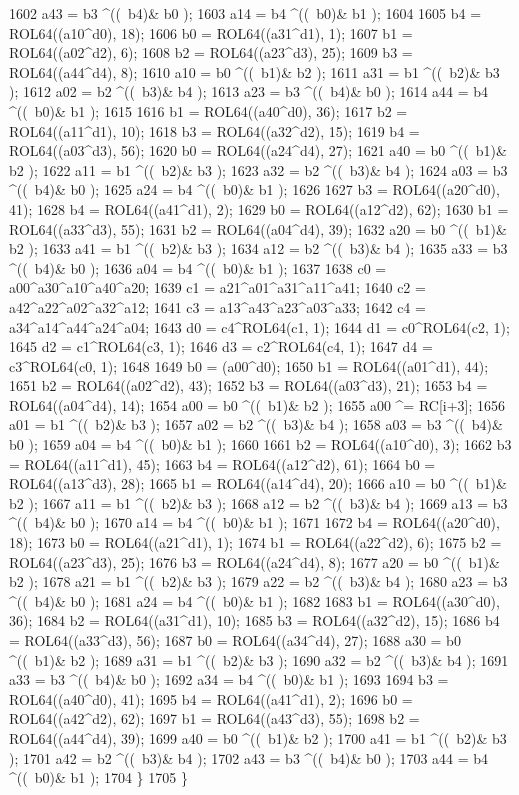 \begin{DoxyCode}
1602     a43 =   b3 ^((~b4)&  b0 );
1603     a14 =   b4 ^((~b0)&  b1 );
1604 
1605     b4 = ROL64((a10^d0), 18);
1606     b0 = ROL64((a31^d1), 1);
1607     b1 = ROL64((a02^d2), 6);
1608     b2 = ROL64((a23^d3), 25);
1609     b3 = ROL64((a44^d4), 8);
1610     a10 =   b0 ^((~b1)&  b2 );
1611     a31 =   b1 ^((~b2)&  b3 );
1612     a02 =   b2 ^((~b3)&  b4 );
1613     a23 =   b3 ^((~b4)&  b0 );
1614     a44 =   b4 ^((~b0)&  b1 );
1615 
1616     b1 = ROL64((a40^d0), 36);
1617     b2 = ROL64((a11^d1), 10);
1618     b3 = ROL64((a32^d2), 15);
1619     b4 = ROL64((a03^d3), 56);
1620     b0 = ROL64((a24^d4), 27);
1621     a40 =   b0 ^((~b1)&  b2 );
1622     a11 =   b1 ^((~b2)&  b3 );
1623     a32 =   b2 ^((~b3)&  b4 );
1624     a03 =   b3 ^((~b4)&  b0 );
1625     a24 =   b4 ^((~b0)&  b1 );
1626 
1627     b3 = ROL64((a20^d0), 41);
1628     b4 = ROL64((a41^d1), 2);
1629     b0 = ROL64((a12^d2), 62);
1630     b1 = ROL64((a33^d3), 55);
1631     b2 = ROL64((a04^d4), 39);
1632     a20 =   b0 ^((~b1)&  b2 );
1633     a41 =   b1 ^((~b2)&  b3 );
1634     a12 =   b2 ^((~b3)&  b4 );
1635     a33 =   b3 ^((~b4)&  b0 );
1636     a04 =   b4 ^((~b0)&  b1 );
1637 
1638     c0 = a00^a30^a10^a40^a20;
1639     c1 = a21^a01^a31^a11^a41;
1640     c2 = a42^a22^a02^a32^a12;
1641     c3 = a13^a43^a23^a03^a33;
1642     c4 = a34^a14^a44^a24^a04;
1643     d0 = c4^ROL64(c1, 1);
1644     d1 = c0^ROL64(c2, 1);
1645     d2 = c1^ROL64(c3, 1);
1646     d3 = c2^ROL64(c4, 1);
1647     d4 = c3^ROL64(c0, 1);
1648 
1649     b0 = (a00^d0);
1650     b1 = ROL64((a01^d1), 44);
1651     b2 = ROL64((a02^d2), 43);
1652     b3 = ROL64((a03^d3), 21);
1653     b4 = ROL64((a04^d4), 14);
1654     a00 =   b0 ^((~b1)&  b2 );
1655     a00 ^= RC[i+3];
1656     a01 =   b1 ^((~b2)&  b3 );
1657     a02 =   b2 ^((~b3)&  b4 );
1658     a03 =   b3 ^((~b4)&  b0 );
1659     a04 =   b4 ^((~b0)&  b1 );
1660 
1661     b2 = ROL64((a10^d0), 3);
1662     b3 = ROL64((a11^d1), 45);
1663     b4 = ROL64((a12^d2), 61);
1664     b0 = ROL64((a13^d3), 28);
1665     b1 = ROL64((a14^d4), 20);
1666     a10 =   b0 ^((~b1)&  b2 );
1667     a11 =   b1 ^((~b2)&  b3 );
1668     a12 =   b2 ^((~b3)&  b4 );
1669     a13 =   b3 ^((~b4)&  b0 );
1670     a14 =   b4 ^((~b0)&  b1 );
1671 
1672     b4 = ROL64((a20^d0), 18);
1673     b0 = ROL64((a21^d1), 1);
1674     b1 = ROL64((a22^d2), 6);
1675     b2 = ROL64((a23^d3), 25);
1676     b3 = ROL64((a24^d4), 8);
1677     a20 =   b0 ^((~b1)&  b2 );
1678     a21 =   b1 ^((~b2)&  b3 );
1679     a22 =   b2 ^((~b3)&  b4 );
1680     a23 =   b3 ^((~b4)&  b0 );
1681     a24 =   b4 ^((~b0)&  b1 );
1682 
1683     b1 = ROL64((a30^d0), 36);
1684     b2 = ROL64((a31^d1), 10);
1685     b3 = ROL64((a32^d2), 15);
1686     b4 = ROL64((a33^d3), 56);
1687     b0 = ROL64((a34^d4), 27);
1688     a30 =   b0 ^((~b1)&  b2 );
1689     a31 =   b1 ^((~b2)&  b3 );
1690     a32 =   b2 ^((~b3)&  b4 );
1691     a33 =   b3 ^((~b4)&  b0 );
1692     a34 =   b4 ^((~b0)&  b1 );
1693 
1694     b3 = ROL64((a40^d0), 41);
1695     b4 = ROL64((a41^d1), 2);
1696     b0 = ROL64((a42^d2), 62);
1697     b1 = ROL64((a43^d3), 55);
1698     b2 = ROL64((a44^d4), 39);
1699     a40 =   b0 ^((~b1)&  b2 );
1700     a41 =   b1 ^((~b2)&  b3 );
1701     a42 =   b2 ^((~b3)&  b4 );
1702     a43 =   b3 ^((~b4)&  b0 );
1703     a44 =   b4 ^((~b0)&  b1 );
1704   \}
1705 \}
\end{DoxyCode}
